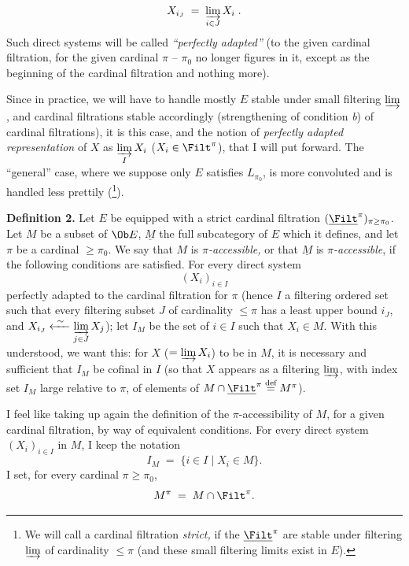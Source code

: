 \[
X_{i_J} \;=\; \varinjlim_{i\in J} X_i \;.
\]
Such direct systems will be called \textit{``perfectly adapted''} (to the given cardinal filtration, for the given cardinal $\pi$ – $\pi_0$ no longer figures in it, except as the beginning of the cardinal filtration and nothing more).

Since in practice, we will have to handle mostly $E$ stable under small filtering $\varinjlim$, and cardinal filtrations stable accordingly (strengthening of condition \textit{b}) of cardinal filtrations), it is this case, and the notion of \textit{perfectly adapted representation} of $X$ as $\varinjlim\limits_{I} X_i$ ($X_i\in\Filt^\pi$), that I will put forward. The ``general'' case, where we suppose only $E$ satisfies $L_{\pi_0}$, is more convoluted and is handled less prettily (\footnote[41]{We will call a cardinal filtration \textit{strict,} if the $\underline{\Filt}^\pi$ are stable under filtering $\varinjlim$ of cardinality $\le\pi$ (and these small filtering limits exist in $E$).}).

\textbf{Definition 2.} Let $E$ be equipped with a strict cardinal filtration $(\underline{\Filt}^\pi)_{\pi\ge\pi_0}$. Let $M$ be a subset of $\Ob E$, $\underline{M}$ the full subcategory of $E$ which it defines, and let $\pi$ be a cardinal $\ge\pi_0$. We say that $M$ is \textit{$\pi$-accessible,} or that $\underline{M}$ is \textit{$\pi$-accessible}, %
if the following conditions are satisfied. For every direct system
\[
(X_i)_{i\in I}
\]
perfectly adapted to the cardinal filtration for $\pi$ (hence $I$ a filtering ordered set such that every filtering subset $J$ of cardinality $\le\pi$ has a least upper bound $i_J$, and $X_{i_J}\xleftarrow{\ \sim\ }\varinjlim\limits_{j\in J} X_j$); let $I_M$ be the set of $i\in I$ such that $X_i\in M$. With this understood, we want this: for $X$ ($=\varinjlim X_i$) to be in $M$, it is necessary and sufficient that $I_M$ be cofinal in $I$ (so that $X$ appears as a filtering $\varinjlim$, with index set $I_M$ large relative to $\pi$, of elements of $M\cap\underline{\Filt}^\pi\overset{\text{def}}{=}M^\pi$).

I feel like taking up again the definition of the $\pi$-accessibility of $M$, for a given cardinal filtration, by way of equivalent conditions. For every direct system $(X_i)_{i\in I}$ in $M$, I keep the notation
\[
I_M \;=\; \{i\in I \mid X_i\in M\}.
\]
I set, for every cardinal $\pi\ge\pi_0$,
\[
M^\pi \;=\; M\cap\Filt^\pi .
\]

